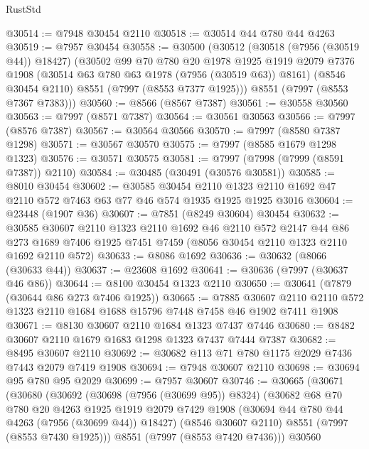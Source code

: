 \begin{lexlean}{RustStd}
\begin{coremodule}
{\begin{coremodule}
{{{{{{{{{{{{{{{{{{{{{{{{{{{{{{{{{{{{{{{{{{{@30514 := @7948 @30454 @2110
@30518 := @30514 @44 @780 @44 @4263
@30519 := @7957 @30454
@30558 := @30500
    (@30512
      (@30518 (@7956 (@30519 @44)) @18427)
      (@30502
        @99
        @70
        @780
        @20
        @1978
        @1925
        @1919
        @2079
        @7376
        @1908
        (@30514 @63 @780 @63 @1978 (@7956 (@30519 @63)) @8161)
        (@8546 @30454 @2110)
        @8551
        (@7997 (@8553 @7377 @1925)))
      @8551
      (@7997 (@8553 @7367 @7383)))
@30560 := @8566 (@8567 @7387)
@30561 := @30558 @30560
@30563 := @7997 (@8571 @7387)
@30564 := @30561 @30563
@30566 := @7997 (@8576 @7387)
@30567 := @30564 @30566
@30570 := @7997 (@8580 @7387 @1298)
@30571 := @30567 @30570
@30575 := @7997 (@8585 @1679 @1298 @1323)
@30576 := @30571 @30575
@30581 := @7997 (@7998 (@7999 (@8591 @7387)) @2110)
@30584 := @30485 (@30491 (@30576 @30581))
@30585 := @8010 @30454
@30602 := @30585
    @30454
    @2110
    @1323
    @2110
    @1692
    @47
    @2110
    @572
    @7463
    @63
    @77
    @46
    @574
    @1935
    @1925
    @1925
    @3016
@30604 := @23448 (@1907 @36)
@30607 := @7851 (@8249 @30604) @30454
@30632 := @30585
    @30607
    @2110
    @1323
    @2110
    @1692
    @46
    @2110
    @572
    @2147
    @44
    @86
    @273
    @1689
    @7406
    @1925
    @7451
    @7459
    (@8056 @30454 @2110 @1323 @2110 @1692 @2110 @572)
@30633 := @8086 @1692
@30636 := @30632 (@8066 (@30633 @44))
@30637 := @23608 @1692
@30641 := @30636 (@7997 (@30637 @46 @86))
@30644 := @8100 @30454 @1323 @2110
@30650 := @30641 (@7879 (@30644 @86 @273 @7406 @1925))
@30665 := @7885
    @30607
    @2110
    @2110
    @572
    @1323
    @2110
    @1684
    @1688
    @15796
    @7448
    @7458
    @46
    @1902
    @7411
    @1908
@30671 := @8130 @30607 @2110 @1684 @1323 @7437 @7446
@30680 := @8482 @30607 @2110 @1679 @1683 @1298 @1323 @7437 @7444 @7387
@30682 := @8495 @30607 @2110
@30692 := @30682 @113 @71 @780 @1175 @2029 @7436 @7443 @2079 @7419 @1908
@30694 := @7948 @30607 @2110
@30698 := @30694 @95 @780 @95 @2029
@30699 := @7957 @30607
@30746 := @30665
    (@30671
      (@30680
        (@30692
          (@30698 (@7956 (@30699 @95)) @8324)
          (@30682
            @68
            @70
            @780
            @20
            @4263
            @1925
            @1919
            @2079
            @7429
            @1908
            (@30694 @44 @780 @44 @4263 (@7956 (@30699 @44)) @18427)
            (@8546 @30607 @2110)
            @8551
            (@7997 (@8553 @7430 @1925)))
          @8551
          (@7997 (@8553 @7420 @7436)))
        @30560
}}}}}}}}}}}}}}}}}}}}}}}}}}}}}}}}}}}}}}}}}}}
\end{coremodule}}
\end{coremodule}
\end{lexlean}
